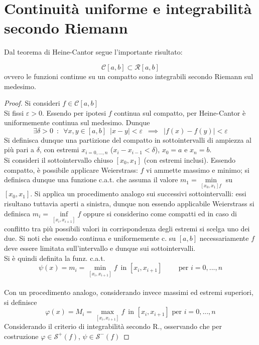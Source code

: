 \documentclass[10pt, oneside]{book}
\theoremstyle{plain}
\begin{document}
\section{Continuità uniforme e integrabilità secondo Riemann}
Dal teorema di Heine-Cantor segue l'importante risultato:

\begin{ther}
    \[\mathcal{C}[a,b] \subset \mathcal{R}[a,b]\]
    ovvero le funzioni continue su un compatto sono integrabili secondo Riemann sul medesimo.
\end{ther}
\begin{proof}
    Si consideri $f \in \mathcal{C}[a,b]$
    \\Si fissi $\varepsilon > 0$. Essendo per ipotesi $f$ continua sul compatto, per Heine-Cantor è uniformemente continua sul medesimo. Dunque
    \[\exists \delta > 0 \enspace : \enspace \forall x,y \in [a,b] \enspace |x-y| < \varepsilon \enspace \implies \enspace |f(x) - f(y)| < \varepsilon\]
    Si definisca dunque una partizione del compatto in sottointervalli di ampiezza al più pari a $\delta$, con estremi $x_{i = 0, ..., n}$ ($x_i - x_{i-1} < \delta$), $x_0 = a$ e $x_n = b$.
    \\Si consideri il sottointervallo chiuso $[x_0, x_1]$ (con estremi inclusi). Essendo compatto, è possibile applicare Weierstrass: $f$ vi ammette massimo e minimo; si definisca dunque una funzione c.a.t. che assuma il valore $m_1 = \min\limits_{[x_0, x_1] f}$ su $[x_0, x_1]$. Si applica un procedimento analogo sui successivi sottointervalli: essi risultano tuttavia aperti a sinistra, dunque non essendo applicabile Weierstrass si definisca $m_i = \inf\limits_{[x_i, x_{i+1}]} f$ oppure si considerino come compatti ed in caso di conflitto tra più possibili valori in corrispondenza degli estremi si scelga uno dei due. Si noti che essendo continua e uniformemente c. su $[a,b]$ necessariamente $f$ deve essere limitata sull'intervallo e dunque sui sottointervalli.
    \\Si è quindi definita la funz. c.a.t.
    \[\psi(x) = m_i = \min \limits_{[x_i, x_{i+1}]} f \enspace \textrm{in $[x_i, x_{i+1}] \qquad $ per $i = 0, ..., n$}\]
    \\Con un procedimento analogo, considerando invece massimi ed estremi superiori, si definisce 
    \[\varphi(x) = M_i = \max \limits_{[x_i, x_{i+1}]} f \enspace \textrm{in $[x_i, x_{i+1}]$ per $i = 0, ..., n$}\]
    Considerando il criterio di integrabilità secondo R., osservando che per costruzione $\varphi \in \mathcal{S}^+(f)$, $\psi \in \mathcal{S}^-(f)$

\end{proof}
\end{document}
